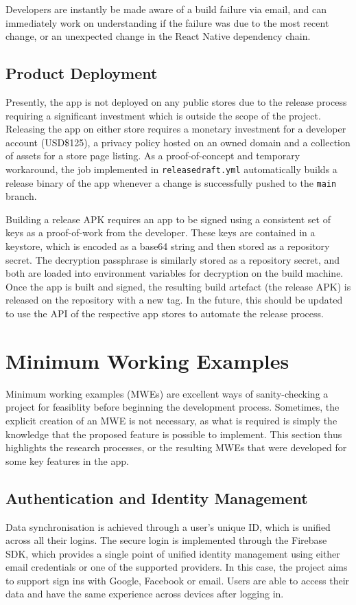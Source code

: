 Developers are instantly be made aware of a build failure via email, and can immediately work on understanding if the failure was due to the most recent change, or an unexpected change in the React Native dependency chain.

\subsection{Product Deployment}
Presently, the app is not deployed on any public stores due to the release process requiring a significant investment which is outside the scope of the project. Releasing the app on either store requires a monetary investment for a developer account (USD\$125), a privacy policy hosted on an owned domain and a collection of assets for a store page listing. As a proof-of-concept and temporary workaround, the job implemented in \texttt{releasedraft.yml} automatically builds a release binary of the app whenever a change is successfully pushed to the \texttt{main} branch.

Building a release APK requires an app to be signed using a consistent set of keys as a proof-of-work from the developer. These keys are contained in a keystore, which is encoded as a base64 string and then stored as a repository secret. The decryption passphrase is similarly stored as a repository secret, and both are loaded into environment variables for decryption on the build machine. Once the app is built and signed, the resulting build artefact (the release APK) is released on the repository with a new tag. In the future, this should be updated to use the API of the respective app stores to automate the release process.

\section{Minimum Working Examples}
Minimum working examples (MWEs) are excellent ways of sanity-checking a project for feasiblity before beginning the development process. Sometimes, the explicit creation of an MWE is not necessary, as what is required is simply the knowledge that the proposed feature is possible to implement. This section thus highlights the research processes, or the resulting MWEs that were developed for some key features in the app.

\subsection{Authentication and Identity Management}
Data synchronisation is achieved through a user's unique ID, which is unified across all their logins. The secure login is implemented through the Firebase SDK, which provides a single point of unified identity management using either email credentials or one of the supported providers. In this case, the project aims to support sign ins with Google, Facebook or email. Users are able to access their data and have the same experience across devices after logging in.

